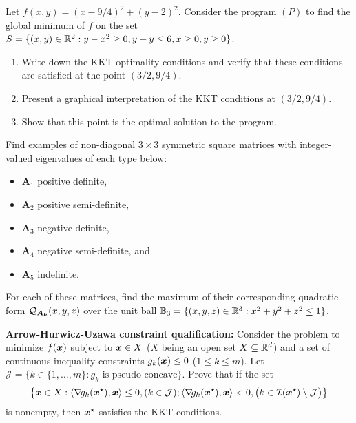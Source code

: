 \begin{problem}[Basic]\cite[lec6\_constr\_opt, 12]{Freund2004nonlinear}
Let $f(x,y)=(x-9/4)^2+(y-2)^2$.  Consider the program $(P)$ to find the global minimum of $f$ on the set $S = \{ (x,y) \in \mathbb{R}^2 : y-x^2 \geq 0, y+y\leq 6, x\geq 0, y \geq 0 \}$. 
\begin{enumerate}
	\item Write down the KKT optimality conditions and verify that these conditions are satisfied at the point $(3/2, 9/4)$.
	\item Present a graphical interpretation of the KKT conditions at $(3/2, 9/4)$.
	\item Show that this point is the optimal solution to the program.
\end{enumerate}
\end{problem}

\begin{problem}[Basic]
Find examples of non-diagonal $3\times 3$ symmetric square matrices with integer-valued eigenvalues of each type below: 
\begin{itemize}
\item $\boldsymbol{A}_1$ positive definite, 
\item $\boldsymbol{A}_2$ positive semi-definite, 
\item $\boldsymbol{A}_3$ negative definite, 
\item $\boldsymbol{A}_4$ negative semi-definite, and 
\item $\boldsymbol{A}_5$ indefinite. 
\end{itemize}
For each of these matrices, find the maximum of their corresponding quadratic form $\mathcal{Q}_{\boldsymbol{A_k}}(x,y,z)$ over the unit ball $\mathbb{B}_3 = \{ (x,y,z) \in \mathbb{R}^3: x^2+y^2+z^2 \leq 1 \}$.
\end{problem}

\begin{problem}[Advanced]\cite[lec6\_constr\_opt, 19]{Freund2004nonlinear}

\noindent\textbf{Arrow-Hurwicz-Uzawa constraint qualification:} Consider the problem to minimize $f(\boldsymbol{x})$ subject to $\boldsymbol{x} \in X$ ($X$ being an open set $X \subseteq \mathbb{R}^d$) and a set of continuous inequality constraints $g_k(\boldsymbol{x})\leq 0$ ($1\leq k \leq m$).  Let $\mathcal{J}=\big\{ k \in \{1, \dotsc, m\} : g_k \text{ is pseudo-concave}\big\}$. Prove that if the set 
\begin{equation*}
\big\{ \boldsymbol{x} \in X : \langle\mathop{\nabla\! {g_k}}(\boldsymbol{x}^{\star}), \boldsymbol{x}\rangle \leq 0, (k \in \mathcal{J}); \langle\mathop{\nabla\! {g_k}}(\boldsymbol{x}^{\star}), \boldsymbol{x} \rangle < 0, \big(k \in \mathcal{I}(\boldsymbol{x}^{\star})\setminus\mathcal{J}\big) \big\}
\end{equation*}
is nonempty, then $\boldsymbol{x}^{\star}$ satisfies the KKT conditions.
\end{problem}